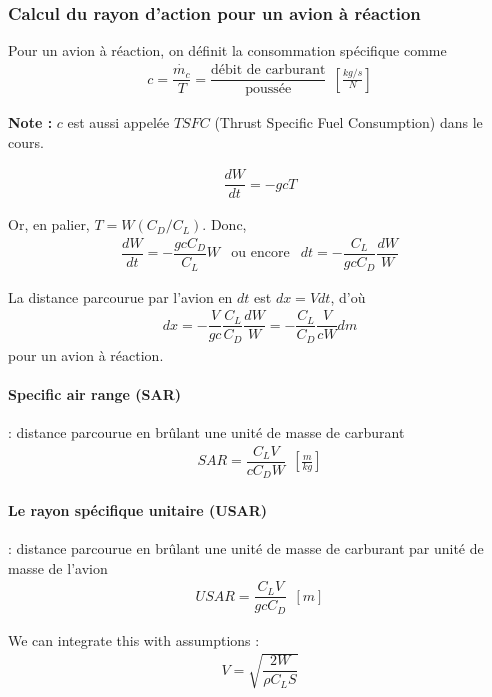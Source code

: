 \documentclass{report}
\begin{document}
\subsubsection{Calcul du rayon d'action pour un avion à réaction}

Pour un avion à réaction, on définit la consommation spécifique comme
\begin{eqnarray}
c = \dfrac{\dot{m_c}}{T}=\dfrac{\text{débit de carburant}}{\text{poussée}}~~[\frac{kg/s}{N}]
\end{eqnarray}

\textbf{Note :} $c$ est aussi appelée $TSFC$ (Thrust Specific Fuel Consumption) dans le cours.

\begin{eqnarray}
\dfrac{dW}{dt} = -gcT
\end{eqnarray}

Or, en palier, $T=W(C_D/C_L)$. Donc,
\begin{eqnarray}
\dfrac{dW}{dt} = -\dfrac{gcC_D}{C_L}W & \text{ou encore} & dt=-\dfrac{C_L}{gcC_D}\dfrac{dW}{W}
\end{eqnarray}

La distance parcourue par l'avion en $dt$ est $dx=Vdt$, d'où
\begin{eqnarray}
dx = -\dfrac{V}{gc}\dfrac{C_L}{C_D}\dfrac{dW}{W} = -\dfrac{C_L}{C_D}\dfrac{V}{c W}dm
\end{eqnarray}
pour un avion à réaction.

\paragraph{Specific air range (SAR)}: distance parcourue en brûlant une unité de masse de carburant 
\begin{eqnarray}
SAR = \dfrac{C_L V}{cC_DW}~~[\frac{m}{kg}]
\end{eqnarray}

\paragraph{Le rayon spécifique unitaire (USAR)}: distance parcourue en brûlant une unité de masse de carburant par unité de masse de l’avion
\begin{eqnarray}
USAR = \dfrac{C_L V}{gcC_D}~~[m]
\end{eqnarray}

We can integrate this with assumptions :
\begin{eqnarray}
V=\sqrt{\dfrac{2W}{\rho C_L S}} 
\end{eqnarray}
\end{document}
